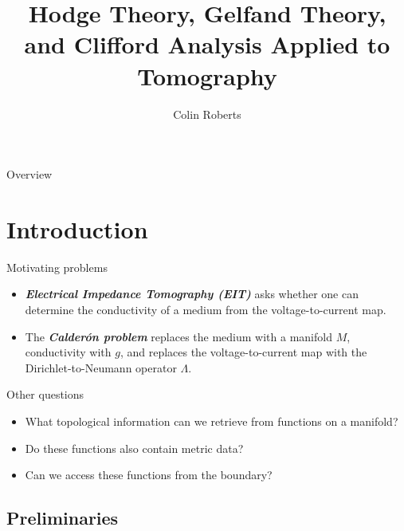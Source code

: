 \documentclass[aspectratio=169]{beamer}
\author{Colin Roberts}
\title{Hodge Theory, Gelfand Theory, and Clifford Analysis Applied to Tomography}
\subtitle{}
\newcommand\boldgreen[1]{\textcolor{lighter_csu_green}{\emph{\textbf{#1}}}}
\begin{document}
\color{white}

\begin{frame}{Overview}
\tableofcontents
\end{frame}

\section{Introduction}

\begin{frame}{Motivating problems}
\vfill
\begin{itemize}
\pause
\item \boldgreen{Electrical Impedance Tomography (EIT)} asks whether one can determine the conductivity of a medium from the voltage-to-current map.
\pause
\item The \boldgreen{Calder\'on problem} replaces the medium with a manifold $M$, conductivity with $g$, and replaces the voltage-to-current map with the Dirichlet-to-Neumann operator $\Lambda$.
\end{itemize}
\vfill
\end{frame}

\begin{frame}{Other questions}
\vfill
    \begin{itemize}
        \pause
        \item What topological information can we retrieve from functions on a manifold?

        \pause
        \item Do these functions also contain metric data?

        \pause
        \item Can we access these functions from the boundary?
    \end{itemize}
\vfill
\end{frame}

\subsection{Preliminaries}
\end{document}
